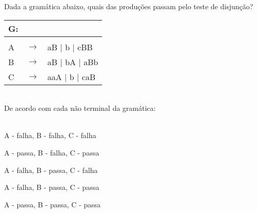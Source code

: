 \question[10] 

Dada a gramática abaixo, quais das produções passam pelo teste de disjunção?\\
\begin{tabular}{|l c l}
	G: & & \\
	\hline \\
	A & $\rightarrow$ & aB | b | cBB \\
    B & $\rightarrow$ & aB | bA | aBb \\
	C & $\rightarrow$ & aaA | b | caB \\
\end{tabular}
\\
De acordo com cada não terminal da gramática:\\
\\
\begin{choices}
\item A - falha, B - falha, C - falha
\item A - passa, B - falha, C - passa %
\item A - falha, B - passa, C - falha
\item A - falha, B - passa, C - passa
\item A - passa, B - passa, C - passa
\end{choices}
\answerline

